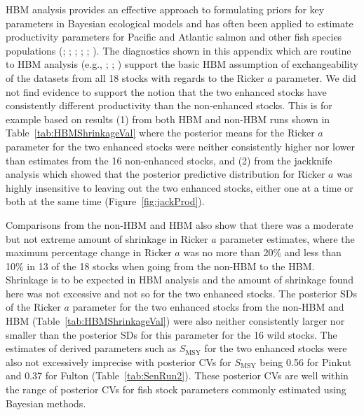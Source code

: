 \documentclass[french,11pt]{book}
\begin{document}
\endgroup{} \endgroup{}

\label{summary}

HBM analysis provides an effective approach to formulating priors for key parameters in Bayesian ecological models and has often been applied to estimate productivity parameters for Pacific and Atlantic salmon and other fish species populations (; ; ; ; ; ). The diagnostics shown in this appendix which are routine to HBM analysis (e.g., ; ; ) support the basic HBM assumption of exchangeability of the datasets from all 18 stocks with regards to the Ricker \(a\) parameter. We did not find evidence to support the notion that the two enhanced stocks have consistently different productivity than the non-enhanced stocks. This is for example based on results (1) from both HBM and non-HBM runs shown in Table~\ref{tab:HBMShrinkageVal} where the posterior means for the Ricker \(a\) parameter for the two enhanced stocks were neither consistently higher nor lower than estimates from the 16 non-enhanced stocks, and (2) from the jackknife analysis which showed that the posterior predictive distribution for Ricker \(a\) was highly insensitive to leaving out the two enhanced stocks, either one at a time or both at the same time (Figure~\ref{fig:jackProd}).

Comparisons from the non-HBM and HBM also show that there was a moderate but not extreme amount of shrinkage in Ricker \(a\) parameter estimates, where the maximum percentage change in Ricker \(a\) was no more than 20\% and less than 10\% in 13 of the 18 stocks when going from the non-HBM to the HBM. Shrinkage is to be expected in HBM analysis and the amount of shrinkage found here was not excessive and not so for the two enhanced stocks. The posterior SDs of the Ricker \(a\) parameter for the two enhanced stocks from the non-HBM and HBM (Table~\ref{tab:HBMShrinkageVal}) were also neither consistently larger nor smaller than the posterior SDs for this parameter for the 16 wild stocks. The estimates of derived parameters such as $S_\textrm{MSY}$ for the two enhanced stocks were also not excessively imprecise with posterior CVs for $S_\textrm{MSY}$ being 0.56 for Pinkut and 0.37 for Fulton (Table~\ref{tab:SenRun2}). These posterior CVs are well within the range of posterior CVs for fish stock parameters commonly estimated using Bayesian methods.
\end{document}

